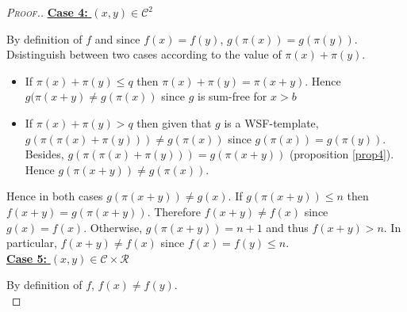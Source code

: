 \begin{proof}[\textsc{Proof.}]
\noindent \underline{\textbf{Case 4:} \((x,y) \in \mathcal{C}^2\)}
\par
By definition of \(f\) and since \(f(x)=f(y)\), \(g(\pi(x)) = g(\pi(y))\). Dsistinguish between two cases according 
to the value of \(\pi(x)+\pi(y)\).
\begin{itemize}
\item If \(\pi(x) + \pi(y) \leqslant q\) then \(\pi(x)+\pi(y) = \pi(x + y)\). Hence \(g(\pi(x + y) \neq g(\pi(x))\) since 
	\(g\) is sum-free for \(x>b\)
\item \begin{sloppypar} 
	If \(\pi(x)+\pi(y)>q\) then given that \(g\) is a WSF-template, \({g(\pi(\pi(x)+\pi(y))) \neq g(\pi(x))}\) since 
	\({g(\pi(x)) = g(\pi(y))}\). Besides,  \({g(\pi(\pi(x)+\pi(y))) = g(\pi(x + y))}\) (proposition \ref{prop4}). Hence \({g(\pi(x + y)) 
	\neq  g(\pi(x))}\).
	\end{sloppypar}
\end{itemize}
\par
Hence in both cases \(g(\pi(x+y)) \neq g(x)\). If  \(g(\pi(x+y)) \leqslant n\) then \(f(x+y) = g(\pi(x+y))\). Therefore 
\(f(x+y) \neq f(x)\) since \(g(x) = f(x)\). Otherwise, \(g(\pi(x+y)) = n + 1\) and thus \(f(x+y) > n\). In particular, 
\(f(x + y) \neq f(x)\) since \(f(x) = f(y) \leqslant n\). \\

\noindent \underline{\textbf{Case 5:} \((x,y) \in \mathcal{C} \times \mathcal{R}\)}
\par
By definition of \(f\), \(f(x) \neq f(y)\).\\


\end{proof}
